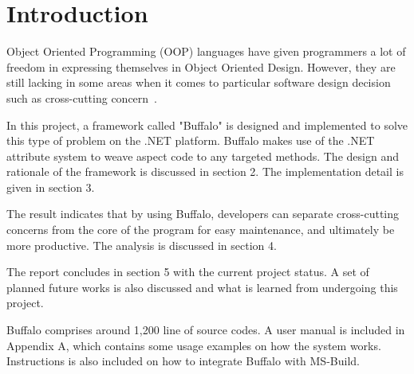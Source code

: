 \chapter{Introduction}

Object Oriented Programming (OOP) languages have given programmers a lot of freedom in expressing themselves in Object Oriented Design. However, they are still lacking in some areas when it comes to particular software design decision such as cross-cutting concern~\cite{aop}.

In this project, a framework called "Buffalo" is designed and implemented to solve this type of problem on the .NET platform. Buffalo makes use of the .NET attribute system to weave aspect code to any targeted methods. The design and rationale of the framework is discussed in section 2. The implementation detail is given in section 3.

The result indicates that by using Buffalo, developers can separate cross-cutting concerns from the core of the program for easy maintenance, and ultimately be more productive. The analysis is discussed in section 4.

The report concludes in section 5 with the current project status. A set of planned future works is also discussed and what is learned from undergoing this project.

Buffalo comprises around 1,200 line of source codes. A user manual is included in Appendix A, which contains some usage examples on how the system works. Instructions is also included on how to integrate Buffalo with MS-Build.
